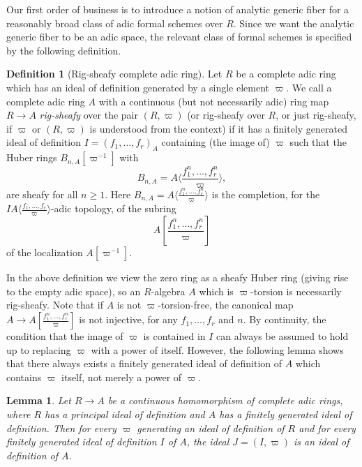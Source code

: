 \documentclass[12pt,twoside,a4paper]{article}
\newtheorem{lemma}[thm]{Lemma}
\theoremstyle{definition}
\newtheorem{mydef}[thm]{Definition}
\theoremstyle{remark}
\begin{document}
Our first order of business is to introduce a notion of analytic generic fiber for a reasonably broad class of adic formal schemes over $R$. Since we want the analytic generic fiber to be an adic space, the relevant class of formal schemes is specified by the following definition.
\begin{mydef}[Rig-sheafy complete adic ring]\label{Locally rig-sheafy formal schemes}Let $R$ be a complete adic ring which has an ideal of definition generated by a single element $\varpi$. We call a complete adic ring $A$ with a continuous (but not necessarily adic) ring map $R\to A$ \textit{rig-sheafy} over the pair $(R, \varpi)$ (or rig-sheafy over $R$, or just rig-sheafy, if $\varpi$ or $(R, \varpi)$ is understood from the context) if it has a finitely generated ideal of definition $I=(f_1,\dots, f_r)_{A}$ containing (the image of) $\varpi$ such that the Huber rings $B_{n,A}[\varpi^{-1}]$ with \begin{equation*}B_{n,A}=A\langle\frac{f_1^{n},\dots, f_r^{n}}{\varpi}\rangle,\end{equation*}are sheafy for all $n\geq1$. Here $B_{n, A}=A\langle\frac{f_1^{n},\dots,f_r^{n}}{\varpi}\rangle$ is the completion, for the $IA\langle\frac{f_1,\dots,f_r}{\varpi}\rangle$-adic topology, of the subring \begin{equation*}A[\frac{f_1^{n},\dots,f_r^{n}}{\varpi}]\end{equation*}of the localization $A[\varpi^{-1}]$.\end{mydef}
In the above definition we view the zero ring as a sheafy Huber ring (giving rise to the empty adic space), so an $R$-algebra $A$ which is $\varpi$-torsion is necessarily rig-sheafy. Note that if $A$ is not $\varpi$-torsion-free, the canonical map $A\to A[\frac{f_1^{n},\dots, f_r^{n}}{\varpi}]$ is not injective, for any $f_1,\dots, f_r$ and $n$. By continuity, the condition that the image of $\varpi$ is contained in $I$ can always be assumed to hold up to replacing $\varpi$ with a power of itself. However, the following lemma shows that there always exists a finitely generated ideal of definition of $A$ which contains $\varpi$ itself, not merely a power of $\varpi$.
\begin{lemma}\label{Ideals containing the pseudo-uniformizer}Let $R\to A$ be a continuous homomorphism of complete adic rings, where $R$ has a principal ideal of definition and $A$ has a finitely generated ideal of definition. Then for every $\varpi$ generating an ideal of definition of $R$ and for every finitely generated ideal of definition $I$ of $A$, the ideal $J=(I, \varpi)$ is an ideal of definition of $A$.\end{lemma}
\end{document}
